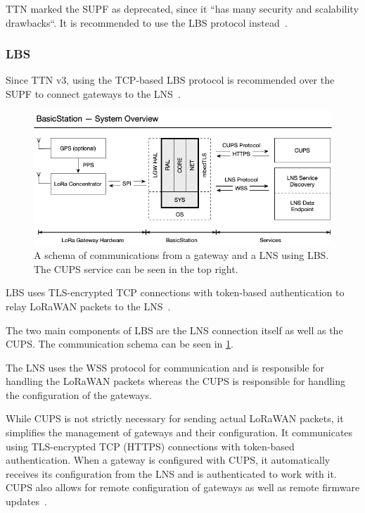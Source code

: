 \ac{TTN} marked the \acl{SUPF} as deprecated, since it ``has many security and scalability drawbacks``.
It is recommended to use the \ac{LBS} protocol instead~\cite{the_things_industries_bv_semtech_2022}.

\subsubsection{\acf{LBS}}\label{sec:lorawan-lbs}

Since \ac{TTN} v3, using the \ac{TCP}-based \acl{LBS} protocol is recommended over the \ac{SUPF} to connect gateways to the \ac{LNS}~\cite{the_things_industries_bv_semtech_2022}.

\begin{figure}[htbp]
    \centering
    \includegraphics[width=1\textwidth]{pictures/lorawan-structure/lora-basics-station-structure.png}
    \caption{
        A schema of communications from a gateway and a \ac{LNS} using \acf{LBS}.
        The \ac{CUPS} service can be seen in the top right.~\protect\cite{semtech_lora_developer_portal_lora_2022}
    }\label{pic:lora-basics-station-schema}
\end{figure}

\ac{LBS} uses \ac{TLS}-encrypted \ac{TCP} connections with token-based authentication to relay \ac{LoRaWAN} packets to the \ac{LNS}~\cite{the_things_industries_bv_lora_2022}.

The two main components of \acl{LBS} are the \ac{LNS} connection itself as well as the \acf{CUPS}.
The communication schema can be seen in \cref{pic:lora-basics-station-schema}.

The \ac{LNS} uses the \ac{WSS} protocol for communication and is responsible for handling the \ac{LoRaWAN} packets whereas the \acl{CUPS} is responsible for handling the configuration of the gateways.

While \ac{CUPS} is not strictly necessary for sending actual \ac{LoRaWAN} packets, it simplifies the management of gateways and their configuration.
It communicates using \ac{TLS}-encrypted \ac{TCP} (\ac{HTTPS}) connections with token-based authentication.
When a gateway is configured with \ac{CUPS}, it automatically receives its configuration from the \ac{LNS} and is authenticated to work with it.
\ac{CUPS} also allows for remote configuration of gateways as well as remote firmware updates~\cite{the_things_industries_bv_lora_2022}.

